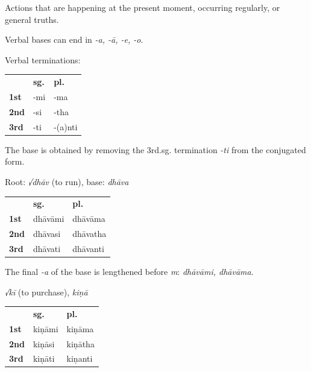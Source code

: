\documentclass[11pt,oneside]{memoir}
\begin{document}
Actions that are happening at the present moment, occurring regularly, or general truths.

Verbal bases can end in \emph{-a, -ā, -e, -o}.

{\centering\par
\begin{multicols}{2}

Verbal terminations:

\begin{center}
\begin{tabular}{lll}
 & \textbf{sg.} & \textbf{pl.}\\[0pt]
\textbf{1st} & -mi & -ma\\[0pt]
\textbf{2nd} & -si & -tha\\[0pt]
\textbf{3rd} & -ti & -(a)nti\\[0pt]
\end{tabular}
\end{center}

The base is obtained by removing the 3rd.sg. termination \emph{-ti} from the conjugated form.

\columnbreak

Root: \emph{√dhāv} (to run), base: \emph{dhāva}

\begin{center}
\begin{tabular}{lll}
 & \textbf{sg.} & \textbf{pl.}\\[0pt]
\textbf{1st} & dhāvāmi & dhāvāma\\[0pt]
\textbf{2nd} & dhāvasi & dhāvatha\\[0pt]
\textbf{3rd} & dhāvati & dhāvanti\\[0pt]
\end{tabular}
\end{center}

The final \emph{-a} of the base is lengthened before \emph{m}: \emph{dhāvāmi, dhāvāma}.

\end{multicols}

\begin{multicols}{3}

\emph{√kī} (to purchase), \emph{kiṇā}

\begin{center}
\begin{tabular}{lll}
 & \textbf{sg.} & \textbf{pl.}\\[0pt]
\textbf{1st} & kiṇāmi & kiṇāma\\[0pt]
\textbf{2nd} & kiṇāsi & kiṇātha\\[0pt]
\textbf{3rd} & kiṇāti & kiṇanti\\[0pt]
\end{tabular}
\end{center}


\end{multicols}}
\end{document}
